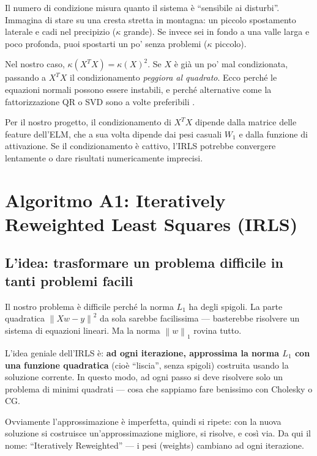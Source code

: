 \documentclass[a4paper,11pt]{article}
\theoremstyle{definition}
\newcommand{\norm}[1]{\left\lVert #1 \right\rVert}
\begin{document}
\begin{analogia}
Il numero di condizione misura quanto il sistema è ``sensibile ai disturbi''. Immagina di stare su una cresta stretta in montagna: un piccolo spostamento laterale e cadi nel precipizio ($\kappa$ grande). Se invece sei in fondo a una valle larga e poco profonda, puoi spostarti un po' senza problemi ($\kappa$ piccolo).

Nel nostro caso, $\kappa(X^TX) = \kappa(X)^2$. Se $X$ è già un po' mal condizionata, passando a $X^TX$ il condizionamento \emph{peggiora al quadrato}. Ecco perché le equazioni normali possono essere instabili, e perché alternative come la fattorizzazione QR o SVD sono a volte preferibili \cite[Lectures~10--11]{nla-slides}.
\end{analogia}

\begin{attenzione}
Per il nostro progetto, il condizionamento di $X^TX$ dipende dalla matrice delle feature dell'ELM, che a sua volta dipende dai pesi casuali $W_1$ e dalla funzione di attivazione. Se il condizionamento è cattivo, l'IRLS potrebbe convergere lentamente o dare risultati numericamente imprecisi.
\end{attenzione}

\section{Algoritmo A1: Iteratively Reweighted Least Squares (IRLS)}
\label{sec:irls}

\subsection{L'idea: trasformare un problema difficile in tanti problemi facili}
\label{subsec:irls_idea}

\begin{intuizione}
Il nostro problema è difficile perché la norma $L_1$ ha degli spigoli. La parte quadratica $\norm{Xw-y}^2$ da sola sarebbe facilissima --- basterebbe risolvere un sistema di equazioni lineari. Ma la norma $\norm{w}_1$ rovina tutto.

L'idea geniale dell'IRLS è: \textbf{ad ogni iterazione, approssima la norma $L_1$ con una funzione quadratica} (cioè ``liscia'', senza spigoli) costruita usando la soluzione corrente. In questo modo, ad ogni passo si deve risolvere solo un problema di minimi quadrati --- cosa che sappiamo fare benissimo con Cholesky o CG.

Ovviamente l'approssimazione è imperfetta, quindi si ripete: con la nuova soluzione si costruisce un'approssimazione migliore, si risolve, e così via. Da qui il nome: ``Iteratively Reweighted'' --- i pesi (weights) cambiano ad ogni iterazione.
\end{intuizione}
\end{document}
